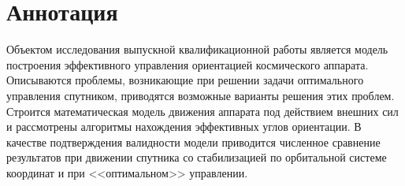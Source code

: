 \chapter*{Аннотация}
\noindent\indent Объектом исследования выпускной квалификационной работы является
модель построения эффективного управления ориентацией космического аппарата.
Описываются проблемы, возникающие при решении задачи оптимального управления
спутником, приводятся возможные варианты решения этих проблем. Строится
математическая модель движения аппарата под действием внешних сил и рассмотрены
алгоритмы нахождения эффективных углов ориентации. В качестве подтверждения
валидности модели приводится численное сравнение результатов при движении спутника
со стабилизацией по орбитальной системе координат и при <<оптимальном>> управлении.
